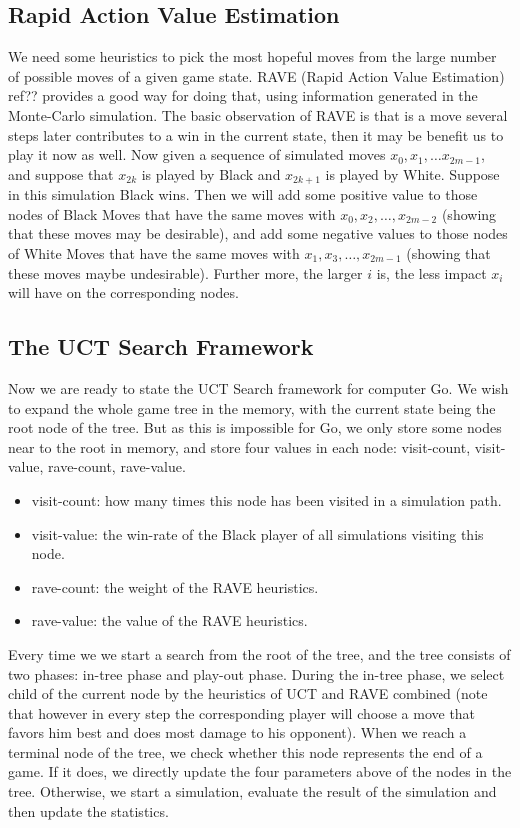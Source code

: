 \subsection{Rapid Action Value Estimation}
We need some heuristics to pick the most hopeful moves from the large number of possible moves of a given game state. RAVE (Rapid Action Value Estimation) ref?? provides a good way for doing that, using information generated in the Monte-Carlo simulation. The basic observation of RAVE is that is a move several steps later contributes to a win in the current state, then it may be benefit us to play it now as well. Now given a sequence of simulated moves $x_0, x_1, \dots x_{2m-1}$, and suppose that $x_{2k}$ is played by Black and $x_{2k+1}$ is played by White. Suppose in this simulation Black wins. Then we will add some positive value to those nodes of Black Moves that have the same moves with $x_0, x_2, \dots, x_{2m-2}$ (showing that these moves may be desirable), and add some negative values to those nodes of White Moves that have the same moves with $x_1, x_3, \dots, x_{2m-1}$ (showing that these moves maybe undesirable). Further more, the larger $i$ is, the less impact $x_i$ will have on the corresponding nodes.


\subsection{The UCT Search Framework}
Now we are ready to state the UCT Search framework for computer Go. We wish to expand the whole game tree in the memory, with the current state being the root node of the tree. But as this is impossible for Go, we only store some nodes near to the root in memory, and store four values in each node: visit-count, visit-value, rave-count, rave-value.
\begin{itemize}
  \item visit-count: how many times this node has been visited in a simulation path.
  \item visit-value: the win-rate of the Black player of all simulations visiting this node.
  \item rave-count: the weight of the RAVE heuristics.
  \item rave-value: the value of the RAVE heuristics.
\end{itemize}

Every time we we start a search from the root of the tree, and the tree consists of two phases: in-tree phase and play-out phase. During the in-tree phase, we select child of the current node by the heuristics of UCT and RAVE combined (note that however in every step the corresponding player will choose a move that favors him best and does most damage to his opponent). When we reach a terminal node of the tree, we check whether this node represents the end of a game. If it does, we directly update the four parameters above of the nodes in the tree. Otherwise, we start a simulation, evaluate the result of the simulation and then update the statistics.

